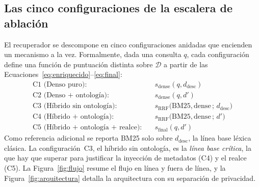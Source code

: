 \documentclass[11pt,letterpaper]{article}
\numberwithin{equation}{section}
\begin{document}
\subsection{Las cinco configuraciones de la escalera de ablación}
\label{sec:escalera-def}
El recuperador se descompone en cinco configuraciones anidadas que encienden un mecanismo a la vez. Formalmente, dada una consulta $q$, cada configuración define una función de puntuación distinta sobre $\mathcal{D}$ a partir de las Ecuaciones~\eqref{eq:enriquecido}--\eqref{eq:final}:
\begin{align}
\text{C1 (Denso puro):}\quad & s_{\text{dense}}(q, d_{\text{desc}}) \label{eq:c1}\\
\text{C2 (Denso + ontología):}\quad & s_{\text{dense}}(q, d') \label{eq:c2}\\
\text{C3 (Híbrido sin ontología):}\quad & s_{\text{RRF}}\big(\text{BM25},\text{dense}\,;\,d_{\text{desc}}\big) \label{eq:c3}\\
\text{C4 (Híbrido + ontología):}\quad & s_{\text{RRF}}\big(\text{BM25},\text{dense}\,;\,d'\big) \label{eq:c4}\\
\text{C5 (Híbrido + ontología + realce):}\quad & s_{\text{final}}(q, d') \label{eq:c5}
\end{align}
Como referencia adicional se reporta BM25 solo sobre $d_{\text{desc}}$, la línea base léxica clásica. La configuración~C3, el híbrido sin ontología, es la \emph{línea base crítica}, la que hay que superar para justificar la inyección de metadatos (C4) y el realce (C5). La Figura~\ref{fig:flujo} resume el flujo en línea y fuera de línea, y la Figura~\ref{fig:arquitectura} detalla la arquitectura con su separación de privacidad.
\end{document}
